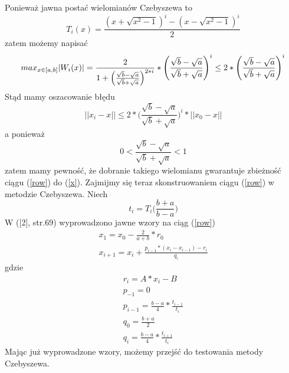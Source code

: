 \documentclass[a4paper]{article}
\begin{document}
Ponieważ jawna postać wielomianów Czebyszewa to
\begin{equation}
T_i(x)=\frac{(x+\sqrt{x^2-1})^i-(x-\sqrt{x^2-1})^i}{2}
\end{equation} 
zatem możemy napisać
\begin{equation}
max_{x \in [a, b]} |W_i(x)| = \frac{2}{1+\Bigl(\frac{\sqrt{b}-\sqrt{a}}{\sqrt{b}+\sqrt{a}}\Bigr)^{2*i}}*\Biggl( \frac{\sqrt{b}-\sqrt{a}}{\sqrt{b}+\sqrt{a}} \Biggr)^{i} \le 2*\Biggl( \frac{\sqrt{b}-\sqrt{a}}{\sqrt{b}+\sqrt{a}} \Biggr)^{i}
\end{equation}
Stąd mamy oszacowanie błędu 
\begin{equation}
||x_i-x|| \le 2*\Biggl( \frac{\sqrt{b}-\sqrt{a}}{\sqrt{b}+\sqrt{a}} \Biggr)^{i}*||x_0-x||
\end{equation}
a ponieważ 
\begin{equation}
0 < \frac{\sqrt{b}-\sqrt{a}}{\sqrt{b}+\sqrt{a}} < 1
\end{equation}
zatem mamy pewność, że dobranie takiego wielomianu gwarantuje zbieżność ciągu (\ref{row}) do (\ref{x}). Zajmijmy się teraz skonstruowaniem ciągu (\ref{row}) w metodzie Czebyszewa. Niech 
\begin{equation}
t_i=T_i\biggl(\frac{b+a}{b-a}\biggr)
\end{equation}
W ([2], str.69) wyprowadzono jawne wzory na ciąg (\ref{row})
\begin{equation}
\label{chebrow}
\begin{array}{c}
x_1=x_0-\frac{2}{a+b}*r_0 \\
x_{i+1}=x_i+\frac{p_{i-1}*(x_i-x_{i-1})-r_i}{q_i}
\end{array}
\end{equation}
gdzie
\begin{equation}
\label{formulas}
\begin{array}{c}
r_i=A*x_i-B \\
p_{-1}=0 \\
p_{i-1}=\frac{b-a}{4}*\frac{t_{i-1}}{t_i} \\
q_0=\frac{b+a}{2} \\
q_i=\frac{b-a}{4}*\frac{t_{i+1}}{t_i}
\end{array}
\end{equation}
Mając już wyprowadzone wzory, możemy przejść do testowania metody Czebyszewa.
\end{document}
